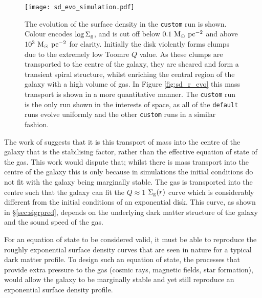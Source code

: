\begin{figure}[ht]
    \texttt{[image: sd\_evo\_simulation.pdf]}
    \caption{The evolution of the surface density in the {\tt custom} run is shown. Colour encodes $\log\Sigma_\mathrm{g}$, and is cut off below $0.1 ~\mathrm{M}_{\odot} ~\mathrm{pc}^{-2}$ and above $10^3 ~\mathrm{M}_{\odot} ~\mathrm{pc}^{-2}$ for clarity. Initially the disk violently forms clumps due to the extremely low Toomre $Q$ value. As these clumps are transported to the centre of the galaxy, they are sheared and form a transient spiral structure, whilst enriching the central region of the galaxy with a high volume of gas. In Figure \ref{fig:sd_r_evo} this mass transport is shown in a more quantitative manner. The {\tt custom} run is the only run shown in the interests of space, as all of the {\tt default} runs evolve uniformly and the other {\tt custom} runs in a similar fashion.}
    \label{fig:sd_evo_small}
\end{figure}


The work of \citet{krumholz_is_2016} suggests that it is this transport of mass into the centre of the galaxy that is the stabilising factor, rather than the effective equation of state of the gas.
This work would dispute that; whilst there is mass transport into the centre of the galaxy this is only because in simulations the initial conditions do not fit with the galaxy being marginally stable.
The gas is transported into the centre such that the galaxy can fit the $Q\approx1$ $\Sigma_\mathrm{g}(r)$ curve which is considerably different from the initial conditions of an exponential disk.
This curve, as shown in \S \ref{sec:sigrpred}, depends on the underlying dark matter structure of the galaxy and the sound speed of the gas.

For an equation of state to be considered valid, it must be able to reproduce the roughly exponential surface density curves that are seen in nature for a typical dark matter profile.
To design such an equation of state, the processes that provide extra pressure to the gas (cosmic rays, magnetic fields, star formation), would allow the galaxy to be marginally stable and yet still reproduce an exponential surface density profile.

